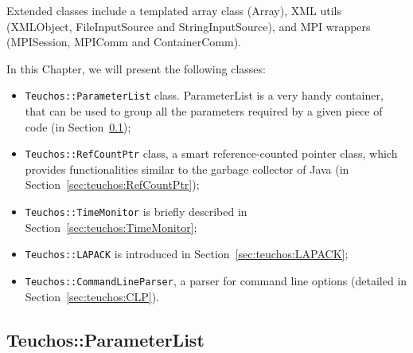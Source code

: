 Extended classes include a templated array class
(Array), XML utils ({XMLObject},
{FileInputSource} and { StringInputSource}),
and MPI wrappers (MPISession, MPIComm
and ContainerComm).

\medskip

In this Chapter, we will present the following classes:
\begin{itemize}
\item \verb!Teuchos::ParameterList! class. ParameterList is a very handy
  container, that can be used to group all the parameters required by a
  given piece of code (in Section~\ref{sec:teuchos:ParameterList});
\item \verb!Teuchos::RefCountPtr! class, a smart reference-counted
  pointer class, which provides functionalities similar to the garbage
  collector of Java (in Section~\ref{sec:teuchos:RefCountPtr});
\item \verb!Teuchos::TimeMonitor! is briefly described in
  Section~\ref{sec:teuchos:TimeMonitor};
\item \verb!Teuchos::LAPACK! is introduced in
  Section~\ref{sec:teuchos:LAPACK};
\item \verb!Teuchos::CommandLineParser!, a parser for command line
  options (detailed in Section~\ref{sec:teuchos:CLP}).
\end{itemize}


\subsection{Teuchos::ParameterList}
\label{sec:teuchos:ParameterList}

